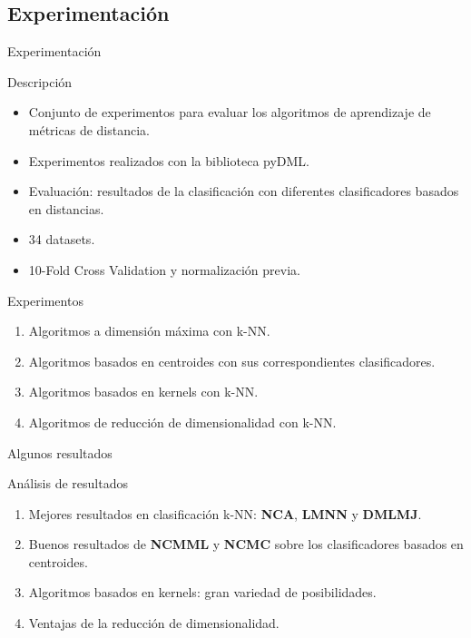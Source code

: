 \documentclass[10pt, compress]{beamer}
\begin{document}
\subsection{Experimentación}

\begin{frame}[shrink]{Experimentación}
  \begin{alertblock}{Descripción}
    \begin{itemize}
      \item Conjunto de experimentos para evaluar los algoritmos de aprendizaje de métricas de distancia.
      \item Experimentos realizados con la biblioteca pyDML.
      \item Evaluación: resultados de la clasificación con diferentes clasificadores basados en distancias.
      \item 34 datasets.
      \item 10-Fold Cross Validation y normalización previa.
    \end{itemize}
  \end{alertblock}

  \begin{block}{Experimentos}
    \begin{enumerate}
      \item Algoritmos a dimensión máxima con k-NN.
      \item Algoritmos basados en centroides con sus correspondientes clasificadores.
      \item Algoritmos basados en kernels con k-NN.
      \item Algoritmos de reducción de dimensionalidad con k-NN.
    \end{enumerate}
  \end{block}

\end{frame}

\begin{frame}{Algunos resultados}
\resizebox{\textwidth}{!}{%
    
}
    
\end{frame}

\begin{frame}{Análisis de resultados}
  \begin{enumerate}
    \item Mejores resultados en clasificación k-NN: \textbf{NCA}, \textbf{LMNN} y \textbf{DMLMJ}.
    \item Buenos resultados de \textbf{NCMML} y \textbf{NCMC} sobre los clasificadores basados en centroides.
    \item Algoritmos basados en kernels: gran variedad de posibilidades.
    \item Ventajas de la reducción de dimensionalidad.
  \end{enumerate}
\end{frame}
\end{document}
